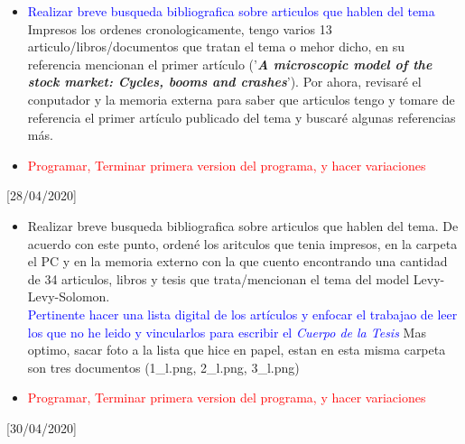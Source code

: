 \documentclass[a4paper,14pt]{article}
\begin{document}
\begin{itemize}
\begin{enumerate}
\begin{itemize}
    de acuerdo con la teoría de - desde el punto de vista de [autor o teoría] esto sugiere que - tal como propone [autor o teoría], esto puede ser interpretado - [autor o teoría] explica que
\item \textcolor{blue}{En esta parte del texto utiizare las herramientas encontradas en la pag\footnote{http://informedecaso.educacion.uc.cl/estructura-a/estructura-a-introduccion}} 
\end{itemize}
\end{enumerate}
\item \textcolor{blue}{Realizar breve busqueda bibliografica sobre articulos que hablen del tema}\\
Impresos los ordenes cronologicamente, tengo varios 13 articulo/libros/documentos que tratan el tema o mehor dicho, en su referencia mencionan el primer artículo ('\textit{\textbf{A microscopic model of the stock market: Cycles, booms and crashes}}'). Por ahora, revisaré el conputador y la memoria externa para saber que articulos tengo y tomare de referencia el primer artículo publicado del tema y buscaré algunas referencias más.
\item \textcolor{red}{Programar, Terminar primera version del programa, y hacer variaciones}
\end{itemize}
[28/04/2020]
\begin{itemize}
\item Realizar breve busqueda bibliografica sobre articulos que hablen del tema. De acuerdo con este punto, ordené los aritculos que tenia impresos, en la carpeta el PC y en la memoria externo con la que cuento encontrando una cantidad de 34 articulos, libros y tesis que trata/mencionan el tema del model Levy-Levy-Solomon. \\
\textcolor{blue}{Pertinente hacer una lista digital de los artículos y enfocar el trabajao de leer los que no he leido y vincularlos para escribir el \textit{Cuerpo de la Tesis}}
Mas optimo, sacar foto a la lista que hice en papel, estan en esta misma carpeta son tres documentos (1\_l.png, 2\_l.png, 3\_l.png)
\item \textcolor{red}{Programar, Terminar primera version del programa, y hacer variaciones}
\end{itemize}
[30/04/2020]
\end{document}
